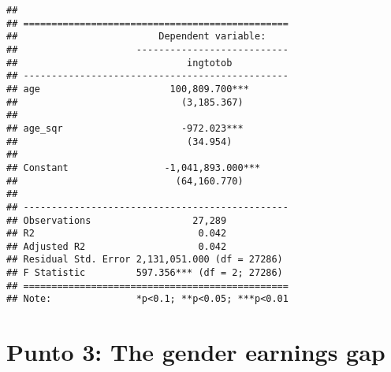 \documentclass[
]{article}
\newenvironment{Shaded}{\begin{snugshade}}{\end{snugshade}}
\newcommand{\AttributeTok}[1]{\textcolor[rgb]{0.77,0.63,0.00}{#1}}
\newcommand{\CommentTok}[1]{\textcolor[rgb]{0.56,0.35,0.01}{\textit{#1}}}
\newcommand{\FunctionTok}[1]{\textcolor[rgb]{0.00,0.00,0.00}{#1}}
\newcommand{\NormalTok}[1]{#1}
\newcommand{\OtherTok}[1]{\textcolor[rgb]{0.56,0.35,0.01}{#1}}
\newcommand{\SpecialCharTok}[1]{\textcolor[rgb]{0.00,0.00,0.00}{#1}}
\newcommand{\StringTok}[1]{\textcolor[rgb]{0.31,0.60,0.02}{#1}}
\begin{document}
\begin{Shaded}
\end{Shaded}

\begin{verbatim}
## 
## ===============================================
##                         Dependent variable:    
##                     ---------------------------
##                              ingtotob          
## -----------------------------------------------
## age                       100,809.700***       
##                             (3,185.367)        
##                                                
## age_sqr                     -972.023***        
##                              (34.954)          
##                                                
## Constant                 -1,041,893.000***     
##                            (64,160.770)        
##                                                
## -----------------------------------------------
## Observations                  27,289           
## R2                             0.042           
## Adjusted R2                    0.042           
## Residual Std. Error 2,131,051.000 (df = 27286) 
## F Statistic         597.356*** (df = 2; 27286) 
## ===============================================
## Note:               *p<0.1; **p<0.05; ***p<0.01
\end{verbatim}

\hypertarget{punto-3-the-gender-earnings-gap}{%
\section{Punto 3: The gender earnings
gap}\label{punto-3-the-gender-earnings-gap}}
\end{document}
